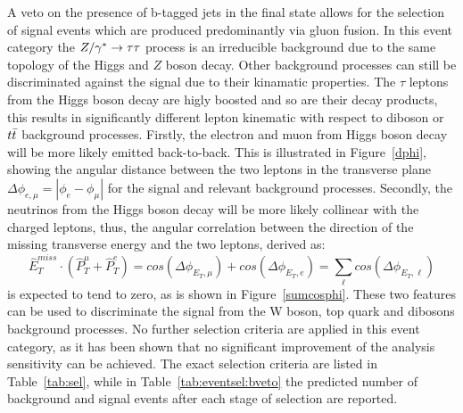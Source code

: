 A veto on the presence of b-tagged jets in the final state allows for the selection of signal events which
are produced predominantly via gluon fusion. In this event category the 
$Z/\gamma^*\rightarrow \tau\tau$  process is an irreducible background due to the same topology of the Higgs and $Z$ boson decay.
Other background processes can still be discriminated against the signal due to their kinamatic properties.
The $\tau$ leptons from the Higgs boson decay are higly boosted and so are their decay products, this results
in significantly different lepton kinematic with respect to diboson or $t\bar{t}$ background processes. 
Firstly, the electron and muon from Higgs boson decay 
will be more likely emitted back-to-back. This is illustrated in Figure~\ref{dphi}, showing 
the angular distance between the two leptons in the transverse plane 
$\Delta\phi_{e,\mu} = |\phi_{e} - \phi_{\mu}|$ for the signal and relevant background processes.  
Secondly, the neutrinos from the Higgs boson decay  will be more likely collinear with the charged leptons,
thus, the angular correlation between the direction of the missing transverse energy and the two leptons,
derived as: 
$$ \hat{E}_{T}^{miss} \cdot ( \hat{P}_{T}^{\mu} + \hat{P}_{T}^{e} ) = cos(\Delta\phi_{E_{T},\mu}) 
+ cos(\Delta\phi_{E_{T},e}) = \sum_\ell cos(\Delta\phi_{E_{T},\ell}) $$
is expected to tend to zero, as is shown in Figure~\ref{sumcosphi}. 
These two features can be used to discriminate the signal from the W boson, top quark and  dibosons background processes.
No further selection criteria are applied in this event category, as it has been shown that no significant improvement
of the analysis sensitivity can be achieved.
The exact selection criteria are listed in Table~\ref{tab:sel}, while in Table~\ref{tab:eventsel:bveto}
the predicted number of background and signal events after each stage of selection are reported.


